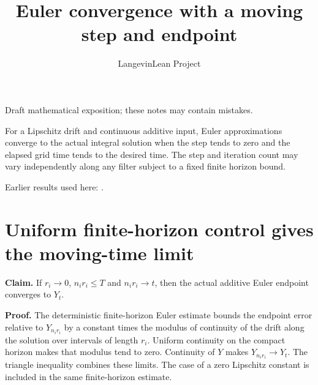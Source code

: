 \documentclass[11pt,a4paper]{article}
\title{\texorpdfstring{Euler convergence with a moving step and endpoint}{Euler convergence with a moving step and endpoint}}
\author{LangevinLean Project}
\date{}
\begin{document}
\maketitle
Draft mathematical exposition; these notes may contain mistakes.


For a Lipschitz drift and continuous additive input, Euler approximations converge to the actual integral solution when the step tends to zero and the elapsed grid time tends to the desired time. The step and iteration count may vary independently along any filter subject to a fixed finite horizon bound.



Earlier results used here: \cite[Section~3.16]{LangevinLean2026ULASC}.

\section{\texorpdfstring{Uniform finite-horizon control gives the moving-time limit}{Uniform finite-horizon control gives the moving-time limit}}


\textbf{Claim.} If \(r_i\to0\), \(n_ir_i\le T\) and \(n_ir_i\to t\), then the actual additive Euler endpoint converges to \(Y_t\).



\textbf{Proof.} The deterministic finite-horizon Euler estimate bounds the endpoint error relative to \(Y_{n_ir_i}\) by a constant times the modulus of continuity of the drift along the solution over intervals of length \(r_i\). Uniform continuity on the compact horizon makes that modulus tend to zero. Continuity of \(Y\) makes \(Y_{n_ir_i}\to Y_t\). The triangle inequality combines these limits. The case of a zero Lipschitz constant is included in the same finite-horizon estimate.
\end{document}
